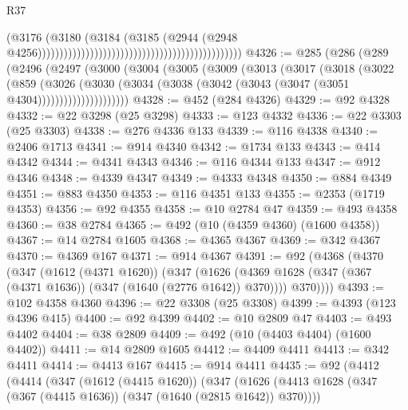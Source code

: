 \begin{lexlean}{R37}
\begin{coremodule}
                                                                                      (@3176
                                                                                        (@3180
                                                                                          (@3184
                                                                                            (@3185
                                                                                              (@2944
                                                                                                (@2948
                                                                                                  @4256)))))))))))))))))))))))))))))))))))))))))))))))
@4326 := @285
    (@286
      (@289
        (@2496
          (@2497
            (@3000
              (@3004
                (@3005
                  (@3009
                    (@3013
                      (@3017
                        (@3018
                          (@3022
                            (@859
                              (@3026
                                (@3030
                                  (@3034
                                    (@3038 (@3042 (@3043 (@3047 (@3051 @4304)))))))))))))))))))))
@4328 := @452 (@284 @4326)
@4329 := @92 @4328
@4332 := @22 @3298 (@25 @3298)
@4333 := @123 @4332
@4336 := @22 @3303 (@25 @3303)
@4338 := @276 @4336 @133
@4339 := @116 @4338
@4340 := @2406 @1713
@4341 := @914 @4340
@4342 := @1734 @133
@4343 := @414 @4342
@4344 := @4341 @4343
@4346 := @116 @4344 @133
@4347 := @912 @4346
@4348 := @4339 @4347
@4349 := @4333 @4348
@4350 := @884 @4349
@4351 := @883 @4350
@4353 := @116 @4351 @133
@4355 := @2353 (@1719 @4353)
@4356 := @92 @4355
@4358 := @10 @2784 @47
@4359 := @493 @4358
@4360 := @38 @2784
@4365 := @492 (@10 (@4359 @4360) (@1600 @4358))
@4367 := @14 @2784 @1605
@4368 := @4365 @4367
@4369 := @342 @4367
@4370 := @4369 @167
@4371 := @914 @4367
@4391 := @92
    (@4368
      (@4370
        (@347
          (@1612 (@4371 @1620))
          (@347
            (@1626 (@4369 @1628 (@347 (@367 (@4371 @1636)) (@347 (@1640 (@2776 @1642)) @370))))
            @370))))
@4393 := @102 @4358 @4360
@4396 := @22 @3308 (@25 @3308)
@4399 := @4393 (@123 @4396 @415)
@4400 := @92 @4399
@4402 := @10 @2809 @47
@4403 := @493 @4402
@4404 := @38 @2809
@4409 := @492 (@10 (@4403 @4404) (@1600 @4402))
@4411 := @14 @2809 @1605
@4412 := @4409 @4411
@4413 := @342 @4411
@4414 := @4413 @167
@4415 := @914 @4411
@4435 := @92
    (@4412
      (@4414
        (@347
          (@1612 (@4415 @1620))
          (@347
            (@1626 (@4413 @1628 (@347 (@367 (@4415 @1636)) (@347 (@1640 (@2815 @1642)) @370))))

\end{coremodule}
\end{lexlean}
